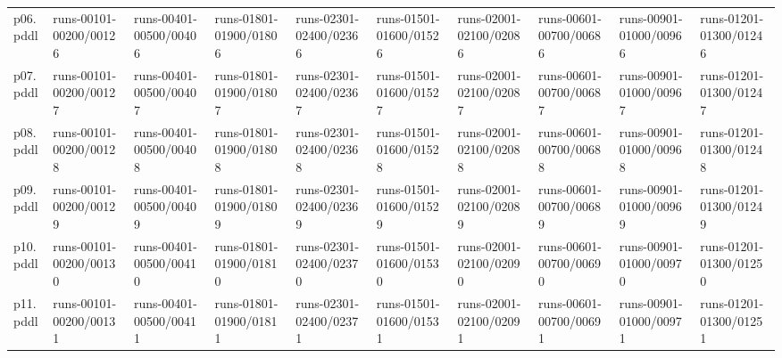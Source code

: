 \documentclass{article}
\begin{document}
\begin{tabular}{@{}lrrrrrrrrr@{}}
p06.pddl & \multicolumn{1}{|l|}{runs-00101-00200/00126} & \multicolumn{1}{|l|}{runs-00401-00500/00406} & \multicolumn{1}{|l|}{runs-01801-01900/01806} & \multicolumn{1}{|l|}{runs-02301-02400/02366} & \multicolumn{1}{|l|}{runs-01501-01600/01526} & \multicolumn{1}{|l|}{runs-02001-02100/02086} & \multicolumn{1}{|l|}{runs-00601-00700/00686} & \multicolumn{1}{|l|}{runs-00901-01000/00966} & \multicolumn{1}{|l|}{runs-01201-01300/01246} \\
p07.pddl & \multicolumn{1}{|l|}{runs-00101-00200/00127} & \multicolumn{1}{|l|}{runs-00401-00500/00407} & \multicolumn{1}{|l|}{runs-01801-01900/01807} & \multicolumn{1}{|l|}{runs-02301-02400/02367} & \multicolumn{1}{|l|}{runs-01501-01600/01527} & \multicolumn{1}{|l|}{runs-02001-02100/02087} & \multicolumn{1}{|l|}{runs-00601-00700/00687} & \multicolumn{1}{|l|}{runs-00901-01000/00967} & \multicolumn{1}{|l|}{runs-01201-01300/01247} \\
p08.pddl & \multicolumn{1}{|l|}{runs-00101-00200/00128} & \multicolumn{1}{|l|}{runs-00401-00500/00408} & \multicolumn{1}{|l|}{runs-01801-01900/01808} & \multicolumn{1}{|l|}{runs-02301-02400/02368} & \multicolumn{1}{|l|}{runs-01501-01600/01528} & \multicolumn{1}{|l|}{runs-02001-02100/02088} & \multicolumn{1}{|l|}{runs-00601-00700/00688} & \multicolumn{1}{|l|}{runs-00901-01000/00968} & \multicolumn{1}{|l|}{runs-01201-01300/01248} \\
p09.pddl & \multicolumn{1}{|l|}{runs-00101-00200/00129} & \multicolumn{1}{|l|}{runs-00401-00500/00409} & \multicolumn{1}{|l|}{runs-01801-01900/01809} & \multicolumn{1}{|l|}{runs-02301-02400/02369} & \multicolumn{1}{|l|}{runs-01501-01600/01529} & \multicolumn{1}{|l|}{runs-02001-02100/02089} & \multicolumn{1}{|l|}{runs-00601-00700/00689} & \multicolumn{1}{|l|}{runs-00901-01000/00969} & \multicolumn{1}{|l|}{runs-01201-01300/01249} \\
p10.pddl & \multicolumn{1}{|l|}{runs-00101-00200/00130} & \multicolumn{1}{|l|}{runs-00401-00500/00410} & \multicolumn{1}{|l|}{runs-01801-01900/01810} & \multicolumn{1}{|l|}{runs-02301-02400/02370} & \multicolumn{1}{|l|}{runs-01501-01600/01530} & \multicolumn{1}{|l|}{runs-02001-02100/02090} & \multicolumn{1}{|l|}{runs-00601-00700/00690} & \multicolumn{1}{|l|}{runs-00901-01000/00970} & \multicolumn{1}{|l|}{runs-01201-01300/01250} \\
p11.pddl & \multicolumn{1}{|l|}{runs-00101-00200/00131} & \multicolumn{1}{|l|}{runs-00401-00500/00411} & \multicolumn{1}{|l|}{runs-01801-01900/01811} & \multicolumn{1}{|l|}{runs-02301-02400/02371} & \multicolumn{1}{|l|}{runs-01501-01600/01531} & \multicolumn{1}{|l|}{runs-02001-02100/02091} & \multicolumn{1}{|l|}{runs-00601-00700/00691} & \multicolumn{1}{|l|}{runs-00901-01000/00971} & \multicolumn{1}{|l|}{runs-01201-01300/01251} \\

\end{tabular}
\end{document}
